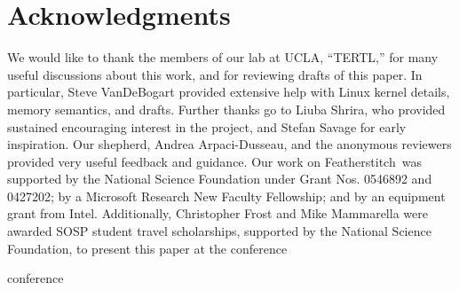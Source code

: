 \documentclass[9pt,twocolumn,letterpaper]{article}
\newcommand{\Kudos}{Featherstitch}
\begin{document}
\section*{Acknowledgments}

We would like to thank the members of our lab at UCLA, ``TERTL,'' for many
useful discussions about this work, and for reviewing drafts of this paper. In
particular, Steve VanDeBogart provided extensive help with Linux
kernel details, memory semantics, and drafts. Further thanks go to Liuba
Shrira, who provided sustained encouraging interest in the project, and
Stefan Savage for early inspiration.
Our shepherd, Andrea Arpaci-Dusseau, and the anonymous reviewers
provided very useful feedback and guidance.
%
Our work on \Kudos\ was supported by the National Science
 Foundation under Grant Nos. 0546892 and 0427202; by a Microsoft Research
 New Faculty Fellowship; and by an equipment grant from Intel.
%
Additionally, Christopher Frost and Mike Mammarella were awarded SOSP student
travel scholarships, supported by the National Science Foundation, to present
this paper at the
\ifpdf
conference

\else
conference

\fi


\end{document}
